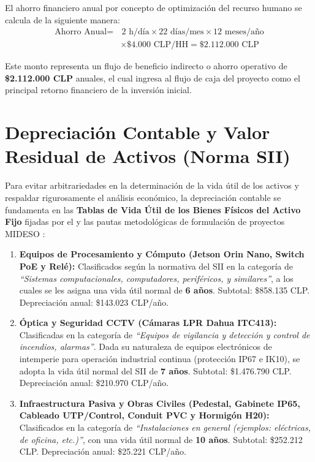 El ahorro financiero anual por concepto de optimización del recurso humano se calcula de la siguiente manera:
\begin{align}
    \text{Ahorro Anual} = & \, 2 \text{ h/día} \times 22 \text{ días/mes} \times 12 \text{ meses/año} \nonumber \\
    & \times \$4.000 \text{ CLP/HH} = \$2.112.000 \text{ CLP}
\end{align}

Este monto representa un flujo de beneficio indirecto o ahorro operativo de \textbf{\$2.112.000 CLP} anuales, el cual ingresa al flujo de caja del proyecto como el principal retorno financiero de la inversión inicial.

\section{Depreciación Contable y Valor Residual de Activos (Norma SII)}
\label{sec:depreciacion_sii}

Para evitar arbitrariedades en la determinación de la vida útil de los activos y respaldar rigurosamente el análisis económico, la depreciación contable se fundamenta en las \textbf{Tablas de Vida Útil de los Bienes Físicos del Activo Fijo} fijadas por el \textcite[Resolución Exenta N° 43]{SIIServicioImpuestos} y las pautas metodológicas de formulación de proyectos MIDESO \parencite{METODOLOGIAGENERAL2025}:

\begin{enumerate}
    \item \textbf{Equipos de Procesamiento y Cómputo (Jetson Orin Nano, Switch PoE y Relé):} Clasificados según la normativa del SII en la categoría de \textit{``Sistemas computacionales, computadores, periféricos, y similares''}, a los cuales se les asigna una vida útil normal de \textbf{6 años}. Subtotal: \$858.135 CLP. Depreciación anual: \$143.023 CLP/año.
    \item \textbf{Óptica y Seguridad CCTV (Cámaras LPR Dahua ITC413):} Clasificadas en la categoría de \textit{``Equipos de vigilancia y detección y control de incendios, alarmas''}. Dada su naturaleza de equipos electrónicos de intemperie para operación industrial continua (protección IP67 e IK10), se adopta la vida útil normal del SII de \textbf{7 años}. Subtotal: \$1.476.790 CLP. Depreciación anual: \$210.970 CLP/año.
    \item \textbf{Infraestructura Pasiva y Obras Civiles (Pedestal, Gabinete IP65, Cableado UTP/Control, Conduit PVC y Hormigón H20):} Clasificados en la categoría de \textit{``Instalaciones en general (ejemplos: eléctricas, de oficina, etc.)''}, con una vida útil normal de \textbf{10 años}. Subtotal: \$252.212 CLP. Depreciación anual: \$25.221 CLP/año.
\end{enumerate}

